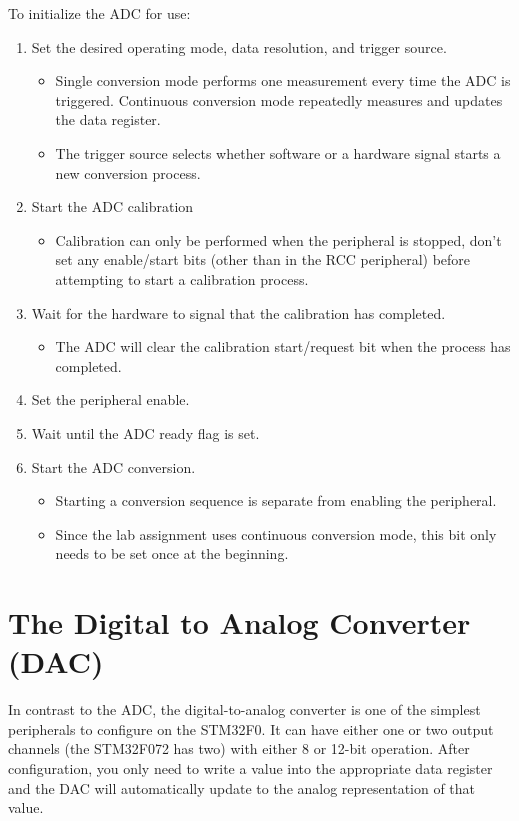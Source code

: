 \documentclass[openany,11pt,fleqn]{book} %
\begin{document}
To initialize the ADC for use:
\begin{enumerate}
    \item Set the desired operating mode, data resolution, and trigger source. 
    \begin{itemize}
        \item Single conversion mode performs one measurement every time the ADC is triggered. Continuous conversion mode repeatedly measures and updates the data register. 
        \item The trigger source selects whether software or a hardware signal starts a new conversion process. 
    \end{itemize}
    \item Start the ADC calibration
    \begin{itemize}
        \item Calibration can only be performed when the peripheral is stopped, don't set any enable/start bits (other than in the RCC peripheral) before attempting to start a calibration process. 
    \end{itemize}
    \item Wait for the hardware to signal that the calibration has completed.
    \begin{itemize}
        \item The ADC will clear the calibration start/request bit when the process has completed. 
    \end{itemize}
    \item Set the peripheral enable.
    \item Wait until the ADC ready flag is set. 
    \item Start the ADC conversion.
    \begin{itemize}
        \item Starting a conversion sequence is separate from enabling the peripheral. 
        \item Since the lab assignment uses continuous conversion mode, this bit only needs to be set once at the beginning. 
    \end{itemize}
\end{enumerate}

\section{The Digital to Analog Converter (DAC)}
In contrast to the ADC, the digital-to-analog converter is one of the simplest peripherals to configure on the STM32F0. It can have either one or two output channels (the STM32F072 has two) with either 8 or 12-bit operation. After configuration, you only need to write a value into the appropriate data register and the DAC will automatically update to the analog representation of that value.
\end{document}
